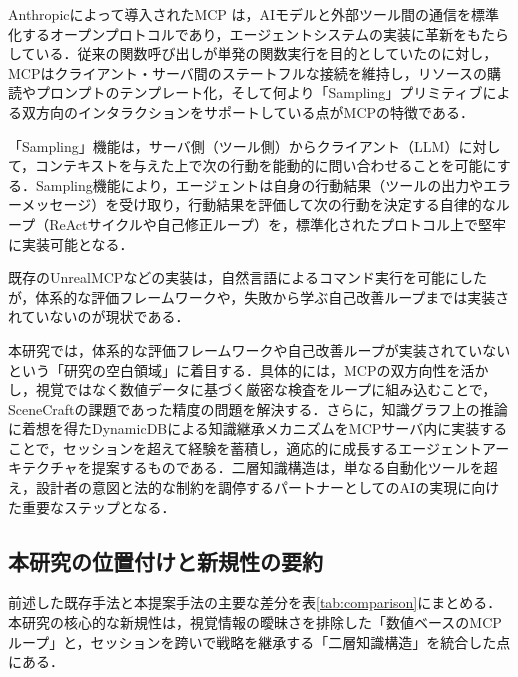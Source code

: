 \documentclass[dvipdfmx, a4paper, 9pt]{deimj}
\begin{document}
Anthropicによって導入されたMCP\cite{anthropic2024mcp} は，AIモデルと外部ツール間の通信を標準化するオープンプロトコルであり，エージェントシステムの実装に革新をもたらしている．従来の関数呼び出しが単発の関数実行を目的としていたのに対し\cite{schick2024toolformer}，MCPはクライアント・サーバ間のステートフルな接続を維持し，リソースの購読やプロンプトのテンプレート化，そして何より「Sampling」プリミティブによる双方向のインタラクションをサポートしている点がMCPの特徴である．

「Sampling」機能は，サーバ側（ツール側）からクライアント（LLM）に対して，コンテキストを与えた上で次の行動を能動的に問い合わせることを可能にする．Sampling機能により，エージェントは自身の行動結果（ツールの出力やエラーメッセージ）を受け取り，行動結果を評価して次の行動を決定する自律的なループ（ReActサイクル\cite{yao2023react}や自己修正ループ\cite{shinn2024reflexion,xi2023rise}）を，標準化されたプロトコル上で堅牢に実装可能となる．

既存のUnrealMCP\cite{unrealmcp2024}などの実装は，自然言語によるコマンド実行を可能にしたが，体系的な評価フレームワークや，失敗から学ぶ自己改善ループまでは実装されていないのが現状である．

本研究では，体系的な評価フレームワークや自己改善ループが実装されていないという「研究の空白領域」に着目する．具体的には，MCPの双方向性を活かし，視覚ではなく数値データに基づく厳密な検査をループに組み込むことで，SceneCraftの課題であった精度の問題を解決する．さらに，知識グラフ上の推論に着想を得たDynamicDBによる知識継承メカニズムをMCPサーバ内に実装することで，セッションを超えて経験を蓄積し，適応的に成長するエージェントアーキテクチャを提案するものである．二層知識構造は，単なる自動化ツールを超え，設計者の意図と法的な制約を調停するパートナーとしてのAIの実現に向けた重要なステップとなる．

\subsection{本研究の位置付けと新規性の要約}

前述した既存手法と本提案手法の主要な差分を表\ref{tab:comparison}にまとめる．本研究の核心的な新規性は，視覚情報の曖昧さを排除した「数値ベースのMCPループ」と，セッションを跨いで戦略を継承する「二層知識構造」を統合した点にある．
\end{document}
